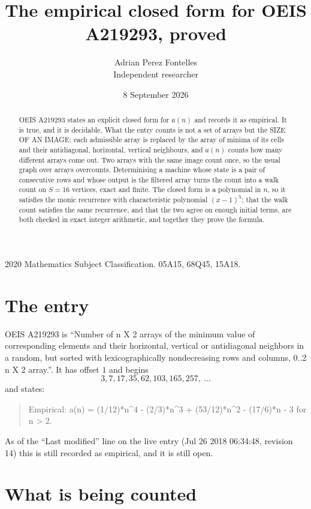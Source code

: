 \documentclass[11pt,a4paper]{article}
\title{The empirical closed form for OEIS A219293, proved}
\author{Adrian Perez Fontelles\\ \small Independent researcher}
\date{8 September 2026}
\theoremstyle{plain}
\theoremstyle{definition}
\begin{document}
\maketitle

\begin{abstract}
OEIS A219293 states an explicit closed form for $a(n)$ and records it as empirical. It is true, and
it is decidable. What the entry counts is not a set of arrays but the SIZE OF AN IMAGE: each
admissible array is replaced by the array of minima of its cells and their antidiagonal, horizontal, vertical neighbours,
and $a(n)$ counts how many different arrays come out. Two arrays with the same image count
once, so the usual graph over arrays overcounts. Determinising a machine whose state is a pair
of consecutive rows and whose output is the filtered array turns the count into a walk count on
$S=16$ vertices, exact and finite. The closed form is a polynomial in $n$, so it satisfies the
monic recurrence with characteristic polynomial $(x-1)^{5}$; that the walk count
satisfies the same recurrence, and that the two agree on enough initial terms, are both checked
in exact integer arithmetic, and together they prove the formula.
\end{abstract}

\noindent\small 2020 Mathematics Subject Classification. 05A15, 68Q45, 15A18.\normalsize

\section{The entry}

OEIS A219293 is ``Number of n X 2 arrays of the minimum value of corresponding elements and their horizontal, vertical or antidiagonal neighbors in a random, but sorted with lexicographically nondecreasing rows and columns, 0..2 n X 2 array.''. It has offset $1$ and begins
\[
3, 7, 17, 35, 62, 103, 165, 257,\ \dots
\]
and states:
\begin{quote}
Empirical: a(n) = (1/12)*n\^{}4 - (2/3)*n\^{}3 + (53/12)*n\^{}2 - (17/6)*n - 3 for n > 2.
\end{quote}
As of the ``Last modified'' line on the live entry (Jul 26 2018 06:34:48, revision 14)
this is still recorded as empirical, and it is still open.

\section{What is being counted}
\end{document}
